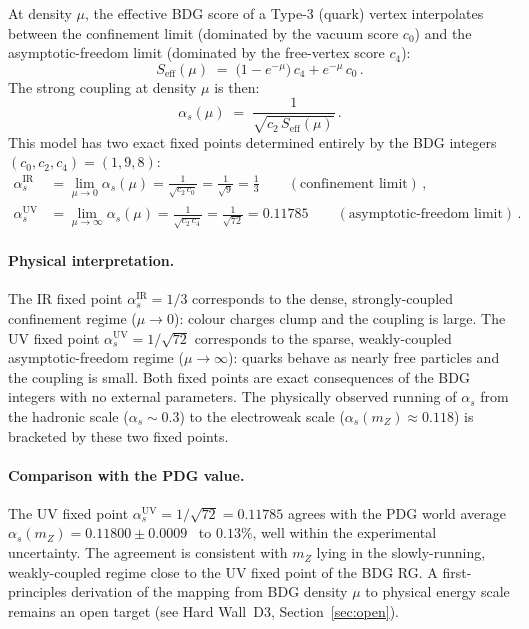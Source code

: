\documentclass[11pt,a4paper]{article}
\begin{document}
At density $\mu$, the effective BDG score of a Type-3 (quark) vertex
interpolates between the confinement limit (dominated by the vacuum
score $c_0$) and the asymptotic-freedom limit (dominated by the
free-vertex score $c_4$):
\begin{equation}
  S_{\mathrm{eff}}(\mu) \;=\;
  \bigl(1 - e^{-\mu}\bigr)\,c_4 + e^{-\mu}\,c_0\,.
  \label{eq:Seff_rg}
\end{equation}
The strong coupling at density $\mu$ is then:
\begin{equation}
  \alpha_s(\mu) \;=\; \frac{1}{\sqrt{c_2\,S_{\mathrm{eff}}(\mu)}}\,.
  \label{eq:alphas_mu}
\end{equation}
This model has two exact fixed points determined entirely by the BDG
integers $(c_0, c_2, c_4) = (1, 9, 8)$:
\begin{align}
  \alpha_s^{\mathrm{IR}} &= \lim_{\mu\to 0}\alpha_s(\mu)
    = \frac{1}{\sqrt{c_2\,c_0}} = \frac{1}{\sqrt{9}} = \frac{1}{3}
    \qquad(\text{confinement limit})\,,
  \label{eq:alpha_IR}\\[4pt]
  \alpha_s^{\mathrm{UV}} &= \lim_{\mu\to\infty}\alpha_s(\mu)
    = \frac{1}{\sqrt{c_2\,c_4}} = \frac{1}{\sqrt{72}} = 0.11785
    \qquad(\text{asymptotic-freedom limit})\,.
  \label{eq:alpha_UV}
\end{align}

\paragraph{Physical interpretation.}
The IR fixed point $\alpha_s^{\mathrm{IR}} = 1/3$ corresponds to the dense,
strongly-coupled confinement regime ($\mu\to 0$): colour charges clump and
the coupling is large.
The UV fixed point $\alpha_s^{\mathrm{UV}} = 1/\sqrt{72}$ corresponds to the
sparse, weakly-coupled asymptotic-freedom regime ($\mu\to\infty$): quarks
behave as nearly free particles and the coupling is small.
Both fixed points are exact consequences of the BDG integers with no external
parameters. The physically observed running of $\alpha_s$ from the hadronic
scale ($\alpha_s \sim 0.3$) to the electroweak scale ($\alpha_s(m_Z) \approx
0.118$) is bracketed by these two fixed points.

\paragraph{Comparison with the PDG value.}
The UV fixed point $\alpha_s^{\mathrm{UV}} = 1/\sqrt{72} = 0.11785$ agrees
with the PDG world average $\alpha_s(m_Z) = 0.11800 \pm 0.0009$~\citep{PDG2024}
to $0.13\%$, well within the experimental uncertainty.
The agreement is consistent with $m_Z$ lying in the slowly-running,
weakly-coupled regime close to the UV fixed point of the BDG RG.
A first-principles derivation of the mapping from BDG density $\mu$ to
physical energy scale remains an open target (see Hard Wall~D3,
Section~\ref{sec:open}).
\end{document}
